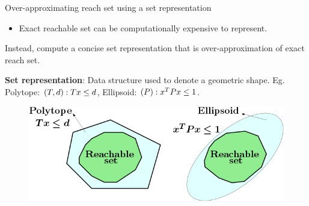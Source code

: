 \begin{frame}{Over-approximating reach set using a set representation}
\begin{itemize}
\item {\color{purple} Exact reachable set} can be {\color{purple} computationally expensive} to {\color{purple} represent}.
\end{itemize}
%
Instead, {\color{blue}compute} a {\color{blue} concise set
representation} that is {\color{blue} over-approximation} of exact
reach set.
%
\begin{alertblock}{}
{\bf Set representation}: {\color{blue} Data structure} used to denote
a {\color{blue} geometric shape}.  Eg. {\color{purple} Polytope}: $\left(T,d\right): Tx\leq d$,
{\color{purple} Ellipsoid}: $\left(P\right): x^TPx\leq 1$.
\end{alertblock}
%
\begin{figure}
\includegraphics[scale=0.35]{figures/set-representation.png}
\end{figure}
%
\end{frame}


